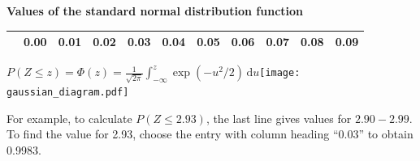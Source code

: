 \documentclass[a4paper]{article}
\begin{document}
\rule{0mm}{14mm}
\begin{center}
  {\Large\bf Values of the standard normal distribution function}
\end{center}

\rule{0mm}{5mm}
\pagestyle{empty}
\thispagestyle{empty}
\begin{table}[ht]
\centering
\begin{tabular}{rllllllllll}
  \hline \rule{0mm}{4mm}
& 0.00 & 0.01 & 0.02 & 0.03 & 0.04 & 0.05 & 0.06 & 0.07 & 0.08 & 0.09 \\  \hline

   \hline
\end{tabular}
\end{table}

\noindent
\(\displaystyle P(Z\leqslant z)=\Phi(z)=\frac{1}{\sqrt{2\pi}}\int_{-\infty}^z\exp\left(-u^2/2\right)\,\mathrm{d}u\)\hfill\hbox{\texttt{[image: gaussian\_diagram.pdf]}}

\noindent For example, to calculate \(P(Z\leqslant 2.93)\), the last
line gives values for \(2.90-2.99\).  To find the value for 2.93,
choose the entry with column heading ``0.03'' to obtain 0.9983.

\end{document}
